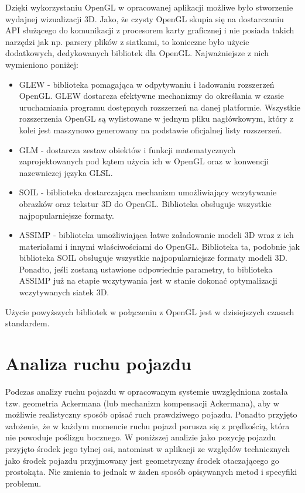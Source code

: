 \documentclass[a4paper,11pt,twoside]{report}
\theoremstyle{definition}
\begin{document}
Dzięki wykorzystaniu OpenGL w opracowanej aplikacji możliwe było stworzenie wydajnej wizualizacji 3D. Jako, że czysty OpenGL skupia się na dostarczaniu API służącego do komunikacji z procesorem karty graficznej i nie posiada takich narzędzi jak np. parsery plików z siatkami, to konieczne było użycie dodatkowych, dedykowanych bibliotek dla OpenGL. Najważniejsze z nich wymieniono poniżej:
\begin{itemize}
	\item GLEW - biblioteka pomagająca w odpytywaniu i ładowaniu rozszerzeń OpenGL. GLEW dostarcza efektywne mechanizmy do określania w czasie uruchamiania programu dostępnych rozszerzeń na danej platformie. Wszystkie rozszerzenia OpenGL są wylistowane w jednym pliku nagłówkowym, który z kolei jest maszynowo generowany na podstawie oficjalnej listy rozszerzeń.
	\item GLM - dostarcza zestaw obiektów i funkcji matematycznych zaprojektowanych pod kątem użycia ich w OpenGL oraz w konwencji nazewniczej języka GLSL.
	\item SOIL - biblioteka dostarczająca mechanizm umożliwiający wczytywanie obrazków oraz tekstur 3D do OpenGL. Biblioteka obsługuje wszystkie najpopularniejsze formaty.
	\item ASSIMP - biblioteka umożliwiająca łatwe załadowanie modeli 3D wraz z ich materiałami i innymi właściwościami do OpenGL. Biblioteka ta, podobnie jak biblioteka SOIL obsługuje wszystkie najpopularniejsze formaty modeli 3D. Ponadto, jeśli zostaną ustawione odpowiednie parametry, to biblioteka ASSIMP już na etapie wczytywania jest w stanie dokonać optymalizacji wczytywanych siatek 3D.
\end{itemize}

Użycie powyższych bibliotek w połączeniu z OpenGL jest w dzisiejszych czasach standardem.

\chapter{Analiza ruchu pojazdu}

Podczas analizy ruchu pojazdu w opracowanym systemie uwzględniona została tzw. geometria Ackermana (lub mechanizm kompensacji Ackermana), aby w możliwie realistyczny sposób opisać ruch prawdziwego pojazdu. Ponadto przyjęto założenie, że w każdym momencie ruchu pojazd porusza się z prędkością, która nie powoduje poślizgu bocznego. W poniższej analizie jako pozycję pojazdu przyjęto środek jego tylnej osi, natomiast w aplikacji ze względów technicznych jako środek pojazdu przyjmowany jest geometryczny środek otaczającego go prostokąta. Nie zmienia to jednak w żaden sposób opisywanych metod i specyfiki problemu.
\end{document}
